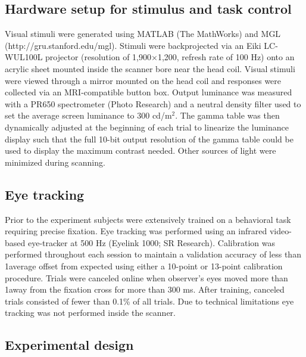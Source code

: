 \documentclass{report}
\begin{document}
\noindent
\subsection{Hardware setup for stimulus and task control}

Visual stimuli were generated using MATLAB (The MathWorks) and MGL \citep{Gardner2018-uq} (http://gru.stanford.edu/mgl). Stimuli were backprojected via an Eiki LC-WUL100L projector (resolution of 1,900×1,200, refresh rate of 100 Hz) onto an acrylic sheet mounted inside the scanner bore near the head coil. Visual stimuli were viewed through a mirror mounted on the head coil and responses were collected via an MRI-compatible button box. Output luminance was measured with a PR650 spectrometer (Photo Research) and a neutral density filter used to set the average screen luminance to 300 cd/m$^2$. The gamma table was then dynamically adjusted at the beginning of each trial to linearize the luminance display such that the full 10-bit output resolution of the gamma table could be used to display the maximum contrast needed. Other sources of light were minimized during scanning.

\noindent
\subsection{Eye tracking}

Prior to the experiment subjects were extensively trained on a behavioral task requiring precise fixation. Eye tracking was performed using an infrared video-based eye-tracker at 500 Hz (Eyelink 1000; SR Research). Calibration was performed throughout each session to maintain a validation accuracy of less than 1\degree  average offset from expected using either a 10-point or 13-point calibration procedure. Trials were canceled online when observer’s eyes moved more than 1\degree  away from the fixation cross for more than 300 ms. After training, canceled trials consisted of fewer than 0.1\% of all trials. Due to technical limitations eye tracking was not performed inside the scanner.

\noindent
\subsection{Experimental design}
\end{document}
